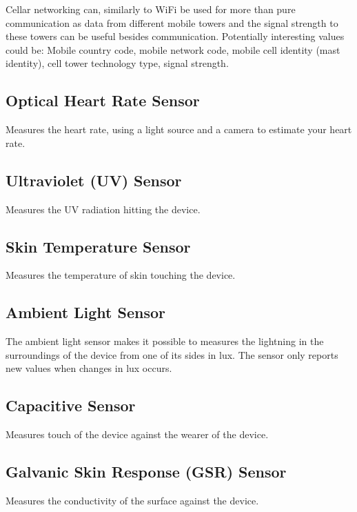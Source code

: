 Cellar networking can, similarly to WiFi be used for more than pure communication as data from different mobile towers and the signal strength to these towers can be useful besides communication. Potentially interesting values could be: Mobile country code, mobile network code, mobile cell identity (mast identity), cell tower technology type, signal strength.

\subsection{Optical Heart Rate Sensor}
\label{sub:optical_heart_rate_sensor}
Measures the heart rate, using a light source and a camera to estimate your heart rate.

\subsection{Ultraviolet (UV) Sensor}
\label{sub:uv_sensor}
Measures the UV radiation hitting the device.

\subsection{Skin Temperature Sensor}
\label{sub:skin_temperature_sensor}
Measures the temperature of skin touching the device.

\subsection{Ambient Light Sensor}
\label{sub:ambient_light_sensor}
The ambient light sensor makes it possible to measures the lightning in the surroundings of the device from one of its sides in lux. The sensor only reports new values when changes in lux occurs.

\subsection{Capacitive Sensor}
\label{sub:capacitive_sensor}
Measures touch of the device against the wearer of the device.

\subsection{Galvanic Skin Response (GSR) Sensor}
\label{sub:galvanic_skin_respons_}
Measures the conductivity of the surface against the device.
